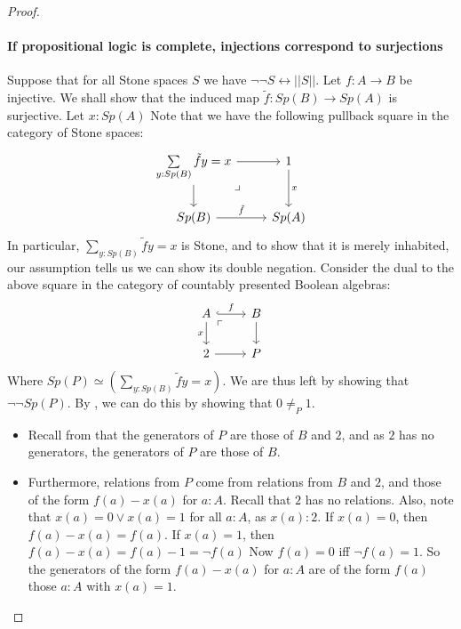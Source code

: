 \begin{proof}
\item \paragraph{If propositional logic is complete, injections correspond to surjections}
  Suppose that for all Stone spaces $S$ we have $\neg \neg S\leftrightarrow ||S||$. 
  Let $f:A\to B$ be injective. We shall show that the induced map $\tilde f: Sp(B) \to Sp(A)$ is surjective. 
  Let $x:Sp(A)$
  Note that we have the following pullback square in the category of Stone spaces:
  \begin{equation}\begin{tikzcd}
    \sum\limits_{y:Sp(B)} \tilde f y = x \arrow[d] \arrow[r] \arrow["\lrcorner"{pos=0.125}, phantom, dr] 
    & 1 \arrow[d,"x"]\\
    Sp(B) \arrow[r,"\tilde f"] & Sp(A)
  \end{tikzcd}  \end{equation}
  In particular, $\sum\limits_{y:Sp(B)} \tilde f y = x$ is Stone, and to show that it is merely inhabited, 
  our assumption tells us we can show its double negation. 
  Consider the dual to the above square in the category of countably presented Boolean algebras:
  \begin{equation}\begin{tikzcd}
    A \arrow[d,"x"'] \arrow[r,hook,"f"] \arrow[rd,phantom,"\ulcorner"{pos=0.125}] & B\arrow[d]\\
    2 \arrow[r] & P
  \end{tikzcd}\end{equation}  
  Where $Sp(P) \simeq  (\sum\limits_{y:Sp(B)} \tilde f y = x)$. 
  We are thus left by showing that $\neg \neg Sp(P)$. By , 
  we can do this by showing that $0\neq_P 1$. 
  \begin{itemize}
    \item 
  Recall from  that the generators of $P$ are those of $B$ and $2$, and as $2$ has no generators, 
  the generators of $P$ are those of $B$. 
    \item 
  Furthermore, relations from $P$ come from relations from $B$ and $2$, 
  and those of the form $f(a) - x(a)$ for $a:A$.
  Recall that $2$ has no relations. Also, 
  note that $x(a)= 0 \vee x(a) = 1$ for all $a:A$, as $x(a):2$. 
  If $x(a)=0$, then $f(a)-x(a)=f(a)$. 
  If $x(a)=1$, then $f(a)-x(a) = f(a)-1= \neg f(a)$
  Now $f(a)=0$ iff $\neg f(a) = 1$. 
  So the generators of the form $f(a)-x(a)$ for $a:A$ are of the form $f(a)$ those $a:A$ with $x(a) = 1$. 


\end{itemize}
\end{proof}
